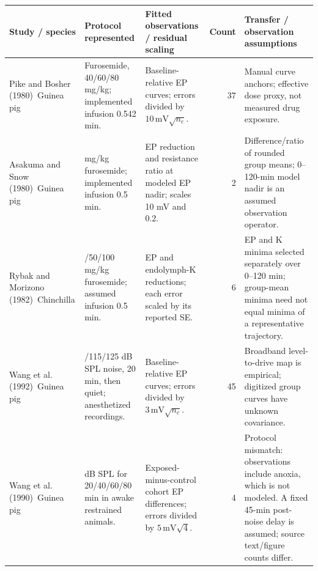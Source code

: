 \clearpage\begingroup
{}\label{tab:fitting-studies}
\centering\fontsize{8}{10}\selectfont
\setlength{\tabcolsep}{4pt}\renewcommand{\arraystretch}{1.12}
\begin{tabular}{@{}>{\raggedright\arraybackslash}p{2.7cm}>{\raggedright\arraybackslash}p{3.7cm}>{\raggedright\arraybackslash}p{4.3cm}r>{\raggedright\arraybackslash}p{5.6cm}@{}}
\toprule \textbf{Study / species} & \textbf{Protocol represented} & \textbf{Fitted observations / residual scaling} & \textbf{Count} & \textbf{Transfer / observation assumptions} \\ \midrule
Pike and Bosher (1980)~\citep{PikeBosher1980}\newline Guinea pig & Furosemide, 40/60/80 mg/kg; implemented infusion 0.542 min. & Baseline-relative EP curves; errors divided by \(10\,\mathrm{mV}\sqrt{n_c}\). & 37 & Manual curve anchors; effective dose proxy, not measured drug exposure. \\[4pt]
Asakuma and Snow (1980)~\citep{AsakumaSnow1980}\newline Guinea pig & 60 mg/kg furosemide; implemented infusion 0.5 min. & EP reduction and resistance ratio at modeled EP nadir; scales 10 mV and 0.2. & 2 & Difference/ratio of rounded group means; 0--120-min model nadir is an assumed observation operator. \\[4pt]
Rybak and Morizono (1982)~\citep{RybakMorizono1982}\newline Chinchilla & 25/50/100 mg/kg furosemide; assumed infusion 0.5 min. & EP and endolymph-K reductions; each error scaled by its reported SE. & 6 & EP and K minima selected separately over 0--120 min; group-mean minima need not equal minima of a representative trajectory. \\[4pt]
Wang et al. (1992)~\citep{Wang1992}\newline Guinea pig & 105/115/125 dB SPL noise, 20 min, then quiet; anesthetized recordings. & Baseline-relative EP curves; errors divided by \(3\,\mathrm{mV}\sqrt{n_c}\). & 45 & Broadband level-to-drive map is empirical; digitized group curves have unknown covariance. \\[4pt]
Wang et al. (1990)~\citep{Wang1990}\newline Guinea pig & 125 dB SPL for 20/40/60/80 min in awake restrained animals. & Exposed-minus-control cohort EP differences; errors divided by \(5\,\mathrm{mV}\sqrt{4}\). & 4 & Protocol mismatch: observations include anoxia, which is not modeled. A fixed 45-min post-noise delay is assumed; source text/figure counts differ. \\[4pt]

\end{tabular}
